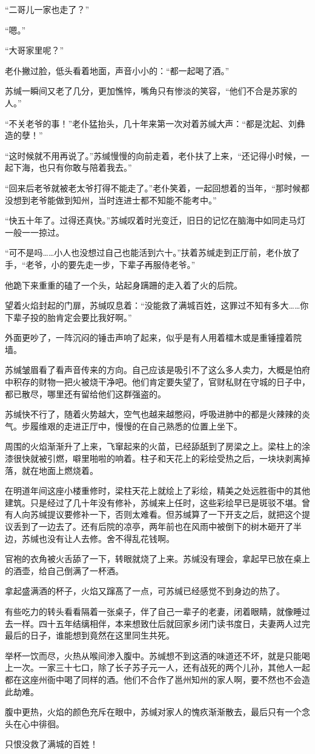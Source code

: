“二哥儿一家也走了？”

“嗯。”

“大哥家里呢？”

老仆撇过脸，低头看着地面，声音小小的：“都一起喝了酒。”

苏缄一瞬间又老了几分，更加憔悴，嘴角只有惨淡的笑容，“他们不合是苏家的人。”

“不关老爷的事！”老仆猛抬头，几十年来第一次对着苏缄大声：“都是沈起、刘彝造的孽！”

“这时候就不用再说了。”苏缄慢慢的向前走着，老仆扶了上来，“还记得小时候，一起下海，也只有你敢与陪着我去。”

“回来后老爷就被老太爷打得不能走了。”老仆笑着，一起回想着的当年，“那时候都没想到老爷能做到知州，当时连进士都不知能不能考中。”

“快五十年了。过得还真快。”苏缄叹着时光变迁，旧日的记忆在脑海中如同走马灯一般一一掠过。

“可不是吗……小人也没想过自己也能活到六十。”扶着苏缄走到正厅前，老仆放了手，“老爷，小的要先走一步，下辈子再服侍老爷。”

他跪下来重重的磕了一个头，站起身蹒跚的走入着了火的后院。

望着火焰封起的门扉，苏缄叹息着：“没能救了满城百姓，这罪过不知有多大……你下辈子投的胎肯定会要比我好啊。”

外面更吵了，一阵沉闷的锤击声响了起来，似乎是有人用着檑木或是重锤撞着院墙。

苏缄皱眉看了看声音传来的方向。自己应该是吸引不了这么多人卖力，大概是怕府中积存的财物一把火被烧干净吧。他们肯定要失望了，官财私财在守城的日子中，都已散尽，哪里还有留给他们这群强盗的。

苏缄快不行了，随着火势越大，空气也越来越憋闷，呼吸进肺中的都是火辣辣的炎气。步履维艰的走进正厅中，慢慢的在自己熟悉的位置上坐下。

周围的火焰渐渐升了上来，飞窜起来的火苗，已经舔舐到了房梁之上。梁柱上的涂漆很快就被引燃，噼里啪啦的响着。柱子和天花上的彩绘受热之后，一块块剥离掉落，就在地面上燃烧着。

在明道年间这座小楼重修时，梁柱天花上就绘上了彩绘，精美之处远胜衙中的其他建筑。只是经过了几十年没有修补，苏缄来上任时，这些彩绘早已是斑驳不堪。曾有人向苏缄提议要修补一下，否则太难看。但苏缄算了一下开支之后，就把这个提议丢到了一边去了。还有后院的凉亭，两年前也在风雨中被倒下的树木砸开了半边，苏缄也没有让人去修。舍不得乱花钱啊。

官袍的衣角被火舌舔了一下，转眼就烧了上来。苏缄没有理会，拿起早已放在桌上的酒壶，给自己倒满了一杯酒。

拿起盛满酒的杯子，火焰又蹿髙了一点，可苏缄已经感觉不到身边的热了。

有些吃力的转头看看隔着一张桌子，伴了自己一辈子的老妻，闭着眼睛，就像睡过去一样。四十五年结缡相伴，本来想致仕后就回家乡闭门读书度日，夫妻两人过完最后的日子，谁能想到竟然在这里同生共死。

举杯一饮而尽，火热从喉间渗入腹中。苏缄想不到这酒的味道还不坏，就是只能喝上一次。一家三十七口，除了长子苏子元一人，还有战死的两个儿孙，其他人一起都在这座州衙中喝了同样的酒。他们不合作了邕州知州的家人啊，要不然也不会造此劫难。

腹中更热，火焰的颜色充斥在眼中，苏缄对家人的愧疚渐渐散去，最后只有一个念头在心中徘徊。

只恨没救了满城的百姓！

